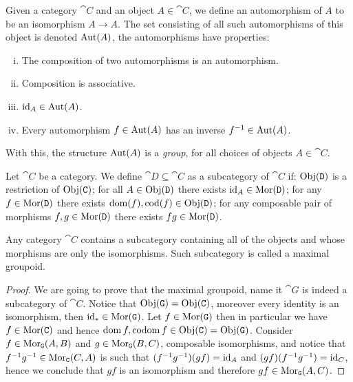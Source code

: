 \begin{definition}[Automorphism]
Given a category \(\cat C\) and an object  \(A \in \cat C\), we define an
automorphism of \(A\) to be an isomorphism \(A \to A\). The set consisting of
all such automorphisms of this object is denoted \(\operatorname{Aut}(A)\), the
automorphisms have properties:
\begin{enumerate}[i.]
\item The composition of two automorphisms is an automorphism.
\item Composition is associative.
\item \(\operatorname{id}_A \in \operatorname{Aut}(A)\).
\item Every automorphism \(f \in \operatorname{Aut}(A)\) has an inverse \(f^{-1}
    \in \operatorname{Aut}(A)\).
\end{enumerate}
With this, the structure \(\operatorname{Aut}(A)\) is a \emph{group}, for all choices of
objects \(A \in \cat{C}\).
\end{definition}

\begin{definition}[Subcategory]\label{def: subcategory}
Let \(\cat C\) be a category. We define \(\cat D \subseteq \cat C\) as a
subcategory of \(\cat C\) if: \(\operatorname{Obj}(\texttt D)\) is a restriction of \(\operatorname{Obj}(\texttt
C)\); for all \(A \in \operatorname{Obj}(\texttt D)\) there exists \(\operatorname{id}_A \in \operatorname{Mor}(\texttt D)\);
for any \(f \in \operatorname{Mor}(\texttt D)\) there exists \(\operatorname{dom}(f), \operatorname{cod}(f) \in
\operatorname{Obj}(\texttt D)\); for any composable pair of morphisms \(f, g \in \operatorname{Mor}(\texttt D)\)
there exists \(f g \in \operatorname{Mor}(\texttt D)\).
\end{definition}

\begin{lemma}
Any category \(\cat C\) contains a subcategory containing all of the objects
and whose morphisms are only the isomorphisms. Such subcategory is called a
maximal groupoid.
\end{lemma}

\begin{proof}
We are going to prove that the maximal groupoid, name it \(\cat G\) is indeed
a subcategory of \(\cat C\). Notice that \(\operatorname{Obj}(\texttt G) = \operatorname{Obj}(\texttt C)\),
moreover every identity is an isomorphism, then \(\operatorname{id}_{*} \in \operatorname{Mor}(\texttt G)\).
Let \(f \in \operatorname{Mor}(\texttt G)\) then in particular we have \(f \in \operatorname{Mor}(\texttt C)\)
and hence \(\operatorname{dom} f, \operatorname{codom} f \in \operatorname{Obj}(\texttt C) =
\operatorname{Obj}(\texttt G)\). Consider \(f \in \operatorname{Mor}_{\texttt G}(A, B)\) and \(g \in \operatorname{Mor}_{\texttt
G}(B, C)\), composable isomorphisms, and notice that \(f^{-1}  g^{-1}
\in \operatorname{Mor}_{\texttt C}(C, A)\) is such that \((f^{-1}  g^{-1})  (g
f) = \operatorname{id}_A\) and \((g  f)  (f^{-1}  g^{-1}) = \operatorname{id}_C\), hence we
conclude that \(g  f\) is an isomorphism and therefore \(g  f \in
\operatorname{Mor}_{\texttt G}(A, C)\).
\end{proof}

